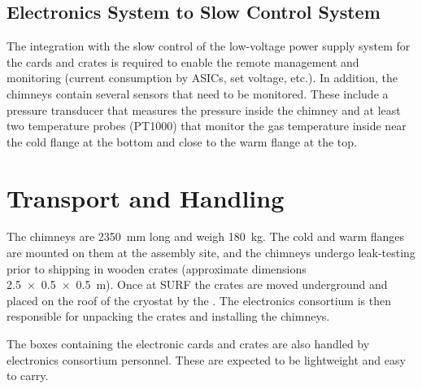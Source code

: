 \subsection{Electronics System to Slow Control System}
\label{sec:fddp-tpc-elec-intfc-sc}

The integration with the slow control of the low-voltage power supply system for the  cards and  crates is required to enable the remote management and monitoring (current consumption by ASICs, set voltage, etc.). In addition, the  chimneys contain several sensors that need to be monitored. These include a pressure transducer that measures the pressure inside the chimney and at least two temperature probes (PT1000) that monitor the gas temperature inside near the cold flange at the bottom and close to the warm flange at the top.  

\section{Transport and Handling}
\label{sec:fddp-tpc-elec-install-transport}

The  chimneys are \SI{2350}{\mm} long %
and weigh \SI{180}{\kg}.  The cold and warm flanges are mounted on them at the assembly site, and the chimneys undergo leak-testing prior to shipping in wooden crates (approximate dimensions \SI[product-units=power]{2.5x0.5x0.5}{m}). %
Once at SURF the crates are moved underground and placed on the roof of the cryostat by the . The %
\dual electronics consortium %
is then responsible for unpacking the crates and installing the  chimneys. %

The boxes containing the electronic cards and  crates are also handled by \dual electronics consortium personnel. These are expected to be lightweight and %
easy to carry. 

